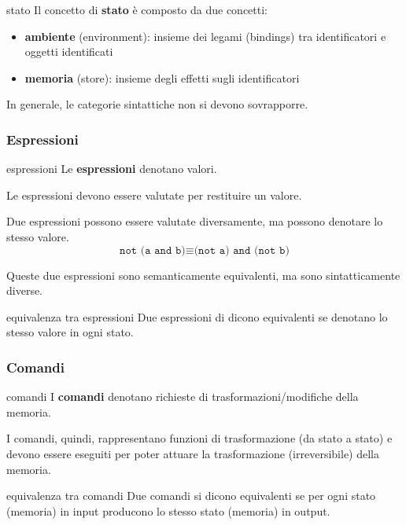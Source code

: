 \begin{mydef}{stato}
    Il concetto di \textbf{stato} è composto da due concetti:
    \begin{itemize}[label=$\triangleright$, itemsep=\smallskipamount]
        \item \textbf{ambiente} (environment): insieme dei legami (bindings) tra identificatori e oggetti identificati
        \item \textbf{memoria} (store): insieme degli effetti sugli identificatori
    \end{itemize}
\end{mydef}

In generale, le categorie sintattiche non si devono sovrapporre.

\subsubsection{Espressioni}
\begin{mydef}{espressioni}
    Le \textbf{espressioni} denotano valori.
\end{mydef}

Le espressioni devono essere valutate per restituire un valore.

\smallskip
Due espressioni possono essere valutate diversamente, ma possono denotare lo stesso valore.
\[
    \texttt{not (a and b)} \equiv \texttt{(not a) and (not b)}
\]

Queste due espressioni sono semanticamente equivalenti, ma sono sintatticamente diverse.

\begin{mydef}{equivalenza tra espressioni}
    Due espressioni di dicono equivalenti se denotano lo stesso valore in ogni stato.
\end{mydef}

\subsubsection{Comandi}
\begin{mydef}{comandi}
    I \textbf{comandi} denotano richieste di trasformazioni/modifiche della memoria.
\end{mydef}

I comandi, quindi, rappresentano funzioni di trasformazione (da stato a stato) e devono essere eseguiti per poter attuare la trasformazione (irreversibile) della memoria.

\begin{mydef}{equivalenza tra comandi}
    Due comandi si dicono equivalenti se per ogni stato (memoria) in input producono lo stesso stato (memoria) in output.
\end{mydef}


